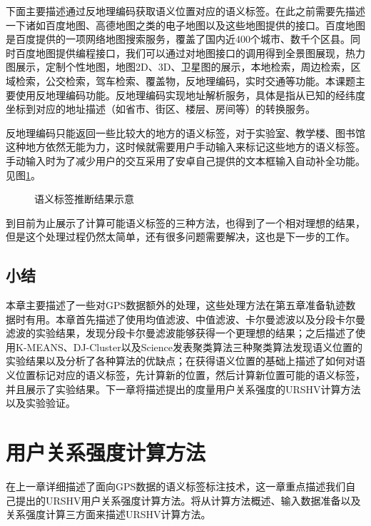 \par 下面主要描述通过反地理编码获取语义位置对应的语义标签。在此之前需要先描述一下诸如百度地图、高德地图之类的电子地图以及这些地图提供的接口。百度地图是百度提供的一项网络地图搜索服务，覆盖了国内近400个城市、数千个区县。同时百度地图提供编程接口，我们可以通过对地图接口的调用得到全景图展现，热力图展示，定制个性地图，地图2D、3D、卫星图的展示，本地检索，周边检索，区域检索，公交检索，驾车检索、覆盖物，反\/地理编码，实时交通等功能。本课题主要使用反地理编码功能。反地理编码实现地址解析服务，具体是指从已知的经纬度坐标到对应的地址描述（如省市、街区、楼层、房间等）的转换服务。
\par 反地理编码只能返回一些比较大的地方的语义标签，对于实验室、教学楼、图书馆这种地方依然无能为力，这时候就需要用户手动输入来标记这些地方的语义标签。手动输入时为了减少用户的交互采用了安卓自己提供的文本框输入自动补全功能。见图\ref{fig:3_15}。
\begin{figure}[htb]
  \centering%
  \caption{语义标签推断结果示意}
  \label{fig:3_15}
\end{figure}
\par 到目前为止展示了计算可能语义标签的三种方法，也得到了一个相对理想的结果，但是这个处理过程仍然太简单，还有很多问题需要解决，这也是下一步的工作。
\section{小结}
\label{sec:section3-4}
本章主要描述了一些对GPS数据额外的处理，这些处理方法在第五章准备轨迹数据时有用。本章首先描述了使用均值滤波、中值滤波、卡尔曼滤波以及分段卡尔曼滤波的实验结果，发现分段卡尔曼滤波能够获得一个更理想的结果；之后描述了使用K-MEANS、DJ-Cluster以及Science发表聚类算法三种聚类算法发现语义位置的实验结果以及分析了各种算法的优缺点；在获得语义位置的基础上描述了如何对语义位置标记对应的语义标签，先计算新的位置，然后计算新位置可能的语义标签，并且展示了实验结果。下一章将描述提出的度量用户关系强度的URSHV计算方法以及实验验证。
\chapter{用户关系强度计算方法}
\label{chap:chapter04}
在上一章详细描述了面向GPS数据的语义标签标注技术，这一章重点描述我们自己提出的URSHV用户关系强度计算方法。将从计算方法概述、输入数据准备以及关系强度计算三方面来描述URSHV计算方法。

